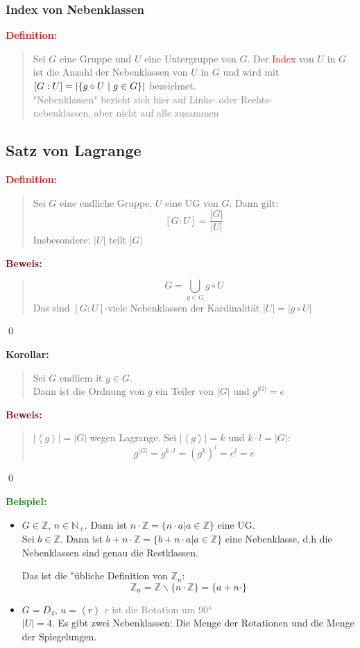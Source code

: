 \documentclass{article}
\newcommand{\smsp}{\phantom{\hspace{3px}}}
\newcommand{\red}[1]{\textcolor{red}{#1}}
\newcommand{\gray}[1]{\textcolor{gray}{#1}}
\newcommand{\green}[1]{\textcolor{green}{#1}}
\newcommand{\dgr}[1]{\textcolor{dgr}{#1}}
\newcommand{\maroon}[1]{\textcolor{maroon}{#1}}
\newcommand{\ex}{\green{\textbf{Beispiel: }}}
\newcommand{\de}[1]{\red{\textbf{Definition: }}\begin{quote}#1\end{quote}}
\newcommand{\co}[1]{\dgr{\textbf{Korollar: }}\begin{quote}#1\end{quote}}
\newcommand{\pr}[1]{\maroon{\textbf{Beweis: }}\begin{quote}#1\end{quote}\qed}
\newcommand{\N}{\mathbb{N}}
\newcommand{\Z}{\mathbb{Z}}
\renewcommand{\st}{\smsp | \smsp}
\newcommand{\spann}[1]{\left\langle#1\right\rangle}
\newcommand{\bs}{\backslash}
\begin{document}
\subsubsection{Index von Nebenklassen}

\de{
    Sei $G$ eine Gruppe und $U$ eine Untergruppe von $G$. Der \red{Index} von $U$ in $G$ ist die Anzahl der Nebenklassen von $U$ in $G$ und wird mit $[G:U] = |\{g \circ U \st g \in G\}|$ bezeichnet.\\
    \gray{"Nebenklassen" bezieht sich hier auf Links- oder Rechts-\\
    nebenklassen, aber nicht auf alle zusammen}
}

\subsection{Satz von Lagrange}

\de{
    Sei $G$ eine endliche Gruppe, $U$ eine UG von $G$. Dann gilt:
    \[
        [G:U] = \frac{|G|}{|U|}
    \]
    Insbesondere: $|U|$ teilt $|G|$
}

\pr{
    $$G = \bigcup_{g \in G} g \circ U$$
    Das sind $[G:U]$-viele Nebenklassen der Kardinalität $|U| = |g \circ U|$
}

\co{
    Sei $G$ endlicm it $g \in G$.\\
    Dann ist  die Ordnung von $g$ ein Teiler von $|G|$ und $g^{|G|} = e$
}

\pr{
    $|\spann{g}| = |G|$ wegen Lagrange. Sei $|\spann{g}| = k$ und $k \cdot l = |G|$:
    \[
        g^{|G|} = g^{k \cdot l} = (g^k)^l = e^l = e
    \]
}

\ex \begin{itemize}
    \item $G \in \Z$, $n \in \N_+$. Dann ist $n \cdot \Z = \{n \cdot a | a \in \Z\}$ eine UG.\\
    Sei $b \in \Z$. Dann ist $b + n \cdot \Z = \{b + n \cdot a | a \in \Z\}$ eine Nebenklasse, d.h die Nebenklassen sind genau die Restklassen.

    Das ist die "übliche Definition von $\Z_n$:
    \[
        \Z_n = \Z \bs \{n \cdot \Z\} = \{a + n \cdot\}
    \]
    \item $G = D_4$, $u = \spann{r}$ \gray{$r$ ist die Rotation um $90$°}\\
    $|U| = 4$. Es gibt zwei Nebenklassen: Die Menge der Rotationen und die Menge der Spiegelungen.
\end{itemize}
\end{document}
